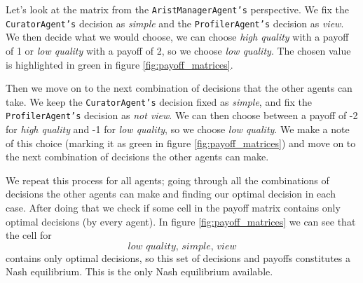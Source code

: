 \documentclass[a4paper, 11pt]{article}
\begin{document}
Let's look at the matrix from the \texttt{AristManagerAgent's} perspective. We fix the \texttt{CuratorAgent's} decision as \textit{simple} and the \texttt{ProfilerAgent's} decision as \textit{view}. We then decide what we would choose, we can choose \textit{high quality} with a payoff of 1 or \textit{low quality} with a payoff of 2, so we choose \textit{low quality}. The chosen value is highlighted in green in figure \ref{fig:payoff_matrices}.

Then we move on to the next combination of decisions that the other agents can take. We keep the \texttt{CuratorAgent's} decision fixed as \textit{simple}, and fix the \texttt{ProfilerAgent's} decision as \textit{not view}. We can then choose between a payoff of -2 for \textit{high quality} and -1 for \textit{low quality}, so we choose \textit{low quality}. We make a note of this choice (marking it as green in figure \ref{fig:payoff_matrices}) and move on to the next combination of decisions the other agents can make.

We repeat this process for all agents; going through all the combinations of decisions the other agents can make and finding our optimal decision in each case. After doing that we check if some cell in the payoff matrix contains only optimal decisions (by every agent). In figure \ref{fig:payoff_matrices} we can see that the cell for \[\textit{low quality, simple, view}\] contains only optimal decisions, so this set of decisions and payoffs constitutes a Nash equilibrium. This is the only Nash equilibrium available.
\end{document}
